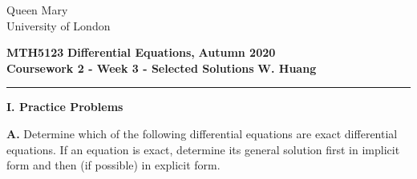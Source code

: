 \documentclass[11pt,a4paper]{article}
\begin{document}
	\begin{singlespace}
		\begin{center}
			\Huge Queen Mary\\
			\LARGE University of London
		\end{center}
		\Large \textbf{MTH5123} \hfill \Large \textbf{Differential Equations,} \hfill \Large \textbf{Autumn 2020}\\
		\large \textbf{Coursework 2 - Week 3 - Selected Solutions} \hfill \large \textbf{W. Huang}
		\rule{\textwidth}{0.4pt}
	\end{singlespace}
	\textbf{I. Practice Problems}\par
	\textbf{A.} Determine which of the following differential equations are exact differential equations. If an equation is exact, determine its general solution first in implicit form and then (if possible) in explicit form.
\end{document}
